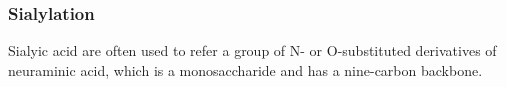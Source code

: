 \subsubsection {Sialylation}
Sialyic acid are often used to refer a group of N- or O-substituted derivatives of neuraminic acid, which is a monosaccharide and has a nine-carbon backbone.